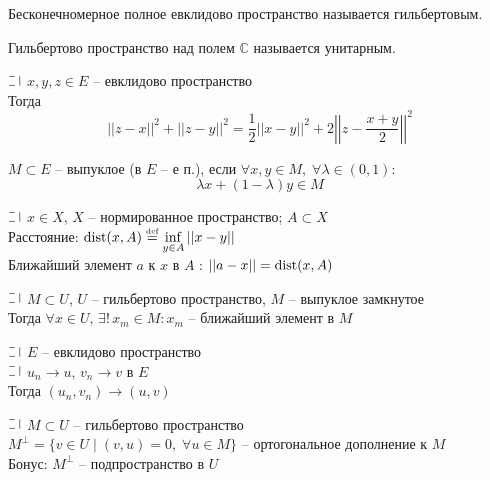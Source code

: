 \begin{definition}
  Бесконечномерное полное евклидово пространство называется гильбертовым.
\end{definition}

\begin{definition}
  Гильбертово пространство над полем $\mathbb{C}$ называется унитарным.
\end{definition}

\begin{utv}
  $\letus$ $x, y, z \in E$ -- евклидово пространство\\
  Тогда $$||z - x||^2 + ||z - y||^2 = \frac{1}{2} ||x - y||^2  + 2 \left|\left|z - \frac{x+y}{2}\right|\right|^2$$
\end{utv}

\begin{definition}
  $M \subset E$ -- выпуклое (в $E$ -- е п.),
  если $\forall x, y \in M, \; \forall \lambda \in (0, 1)$: $$\lambda x + (1-\lambda)y \in M$$
\end{definition}

\begin{definition}
  $\letus$ $x \in X$, $X$ -- нормированное пространство; $A \subset X$\\
  Расстояние: $\text{dist}(x, A) \overset{\text{\tiny def}}=  \inf\limits_{y\in A}||x - y||$\\
  Ближайший элемент $a$ к $x$ в $A$ : $||a - x|| = \text{dist}(x, A)$
\end{definition}

\begin{theorem}
  $\letus$ $M \subset U$, $U$ -- гильбертово пространство, $M$ -- выпуклое замкнутое\\
  Тогда $\forall x \in U, \, \exists! \, x_m \in M: x_m$ -- ближайший элемент в $M$
\end{theorem}

\begin{lemma}
  $\letus$ $E$ -- евклидово пространство\\
  $\letus$ $u_n \longrightarrow u$, $v_n \longrightarrow v$ в $E$\\
  Тогда $(u_n, v_n) \longrightarrow (u, v)$
\end{lemma}

\begin{definition}
  $\letus$ $M \subset U$ -- гильбертово пространство\\
  $M^{\perp} = \{v \in U \mid (v, u) = 0, \; \forall u \in M \}$ -- ортогональное дополнение к $M$\\
  Бонус: $M^{\perp}$ -- подпространство в $U$
\end{definition}


